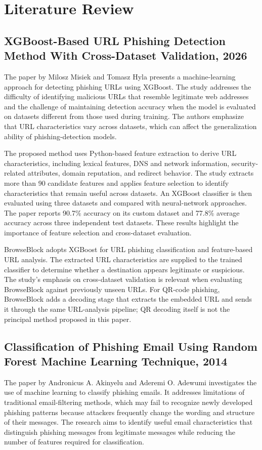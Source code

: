 \chapter{Literature Review}
\setcounter{equation}{0}
\sloppy

\section{XGBoost-Based URL Phishing Detection Method With Cross-Dataset Validation, 2026}
The paper by Milosz Misiek and Tomasz Hyla presents a machine-learning approach
for detecting phishing URLs using XGBoost. The study addresses the difficulty of
identifying malicious URLs that resemble legitimate web addresses and the
challenge of maintaining detection accuracy when the model is evaluated on
datasets different from those used during training. The authors emphasize that
URL characteristics vary across datasets, which can affect the generalization
ability of phishing-detection models.

The proposed method uses Python-based feature extraction to derive URL
characteristics, including lexical features, DNS and network information,
security-related attributes, domain reputation, and redirect behavior. The study
extracts more than 90 candidate features and applies feature selection to identify
characteristics that remain useful across datasets. An XGBoost classifier is then
evaluated using three datasets and compared with neural-network approaches. The
paper reports 90.7\% accuracy on its custom dataset and 77.8\% average accuracy
across three independent test datasets. These results highlight the importance of
feature selection and cross-dataset evaluation.

BrowseBlock adopts XGBoost for URL phishing classification and feature-based URL
analysis. The extracted URL characteristics are supplied to the trained classifier
to determine whether a destination appears legitimate or suspicious. The study's
emphasis on cross-dataset validation is relevant when evaluating BrowseBlock
against previously unseen URLs. For QR-code phishing, BrowseBlock adds a decoding
stage that extracts the embedded URL and sends it through the same URL-analysis
pipeline; QR decoding itself is not the principal method proposed in this paper.

\clearpage
\section{Classification of Phishing Email Using Random Forest Machine Learning Technique, 2014}
The paper by Andronicus A. Akinyelu and Aderemi O. Adewumi investigates the use
of machine learning to classify phishing emails. It addresses limitations of
traditional email-filtering methods, which may fail to recognize newly developed
phishing patterns because attackers frequently change the wording and structure of
their messages. The research aims to identify useful email characteristics that
distinguish phishing messages from legitimate messages while reducing the number
of features required for classification.

